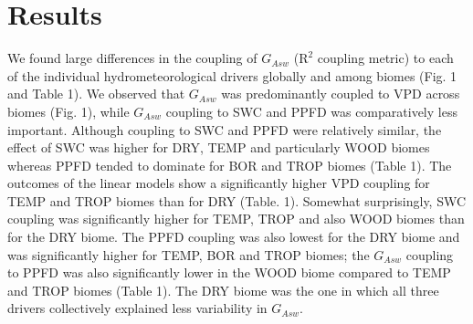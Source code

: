 \documentclass[11pt,twoside]{reedthesis}
\begin{document}
\section{Results}\label{results}

We found large differences in the coupling of \(G_{Asw}\)
(\(\text{R}^2\) coupling metric) to each of the individual
hydrometeorological drivers globally and among biomes (Fig. 1 and Table
1). We observed that \(G_{Asw}\) was predominantly coupled to VPD across
biomes (Fig. 1), while \(G_{Asw}\) coupling to SWC and PPFD was
comparatively less important. Although coupling to SWC and PPFD were
relatively similar, the effect of SWC was higher for DRY, TEMP and
particularly WOOD biomes whereas PPFD tended to dominate for BOR and
TROP biomes (Table 1). The outcomes of the linear models show a
significantly higher VPD coupling for TEMP and TROP biomes than for DRY
(Table. 1). Somewhat surprisingly, SWC coupling was significantly higher
for TEMP, TROP and also WOOD biomes than for the DRY biome. The PPFD
coupling was also lowest for the DRY biome and was significantly higher
for TEMP, BOR and TROP biomes; the \(G_{Asw}\) coupling to PPFD was also
significantly lower in the WOOD biome compared to TEMP and TROP biomes
(Table 1). The DRY biome was the one in which all three drivers
collectively explained less variability in \(G_{Asw}\).\par
\end{document}
